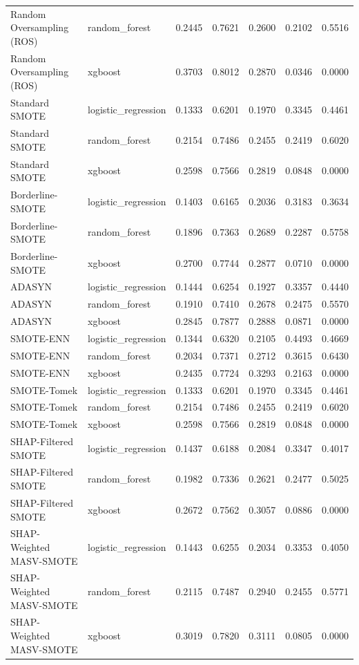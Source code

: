 \begin{table}[htbp]
\begin{tabular}{lllllll}
Random Oversampling (ROS) & random_forest & 0.2445 & 0.7621 & 0.2600 & 0.2102 & 0.5516 \\
Random Oversampling (ROS) & xgboost & 0.3703 & 0.8012 & 0.2870 & 0.0346 & 0.0000 \\
Standard SMOTE & logistic_regression & 0.1333 & 0.6201 & 0.1970 & 0.3345 & 0.4461 \\
Standard SMOTE & random_forest & 0.2154 & 0.7486 & 0.2455 & 0.2419 & 0.6020 \\
Standard SMOTE & xgboost & 0.2598 & 0.7566 & 0.2819 & 0.0848 & 0.0000 \\
Borderline-SMOTE & logistic_regression & 0.1403 & 0.6165 & 0.2036 & 0.3183 & 0.3634 \\
Borderline-SMOTE & random_forest & 0.1896 & 0.7363 & 0.2689 & 0.2287 & 0.5758 \\
Borderline-SMOTE & xgboost & 0.2700 & 0.7744 & 0.2877 & 0.0710 & 0.0000 \\
ADASYN & logistic_regression & 0.1444 & 0.6254 & 0.1927 & 0.3357 & 0.4440 \\
ADASYN & random_forest & 0.1910 & 0.7410 & 0.2678 & 0.2475 & 0.5570 \\
ADASYN & xgboost & 0.2845 & 0.7877 & 0.2888 & 0.0871 & 0.0000 \\
SMOTE-ENN & logistic_regression & 0.1344 & 0.6320 & 0.2105 & 0.4493 & 0.4669 \\
SMOTE-ENN & random_forest & 0.2034 & 0.7371 & 0.2712 & 0.3615 & 0.6430 \\
SMOTE-ENN & xgboost & 0.2435 & 0.7724 & 0.3293 & 0.2163 & 0.0000 \\
SMOTE-Tomek & logistic_regression & 0.1333 & 0.6201 & 0.1970 & 0.3345 & 0.4461 \\
SMOTE-Tomek & random_forest & 0.2154 & 0.7486 & 0.2455 & 0.2419 & 0.6020 \\
SMOTE-Tomek & xgboost & 0.2598 & 0.7566 & 0.2819 & 0.0848 & 0.0000 \\
SHAP-Filtered SMOTE & logistic_regression & 0.1437 & 0.6188 & 0.2084 & 0.3347 & 0.4017 \\
SHAP-Filtered SMOTE & random_forest & 0.1982 & 0.7336 & 0.2621 & 0.2477 & 0.5025 \\
SHAP-Filtered SMOTE & xgboost & 0.2672 & 0.7562 & 0.3057 & 0.0886 & 0.0000 \\
SHAP-Weighted MASV-SMOTE & logistic_regression & 0.1443 & 0.6255 & 0.2034 & 0.3353 & 0.4050 \\
SHAP-Weighted MASV-SMOTE & random_forest & 0.2115 & 0.7487 & 0.2940 & 0.2455 & 0.5771 \\
SHAP-Weighted MASV-SMOTE & xgboost & 0.3019 & 0.7820 & 0.3111 & 0.0805 & 0.0000 \\
\bottomrule
\end{tabular}
\end{table}
